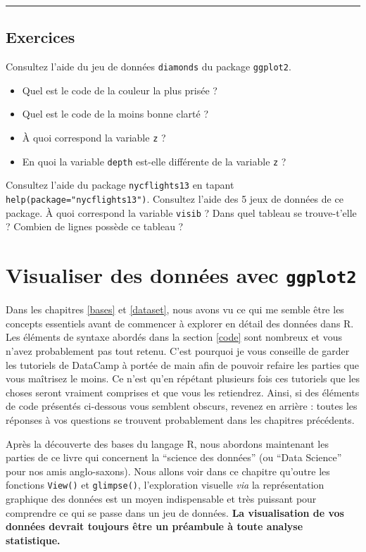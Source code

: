 \documentclass[a4paperpaper,]{article}
\providecommand{\tightlist}{%
  \setlength{\itemsep}{0pt}\setlength{\parskip}{0pt}}
\theoremstyle{definition}
\theoremstyle{definition}
\theoremstyle{definition}
\theoremstyle{remark}
\begin{document}
\begin{center}\rule{0.5\linewidth}{\linethickness}\end{center}

\subsection{Exercices}\label{exercices-1}

Consultez l'aide du jeu de données \texttt{diamonds} du package
\texttt{ggplot2}.

\begin{itemize}
\tightlist
\item
  Quel est le code de la couleur la plus prisée ?
\item
  Quel est le code de la moins bonne clarté ?
\item
  À quoi correspond la variable \texttt{z} ?
\item
  En quoi la variable \texttt{depth} est-elle différente de la variable
  \texttt{z} ?
\end{itemize}

Consultez l'aide du package \texttt{nycflights13} en tapant
\texttt{help(package="nycflights13")}. Consultez l'aide des 5 jeux de
données de ce package. À quoi correspond la variable \texttt{visib} ?
Dans quel tableau se trouve-t'elle ? Combien de lignes possède ce
tableau ?

\section{\texorpdfstring{Visualiser des données avec
\texttt{ggplot2}}{Visualiser des données avec ggplot2}}\label{viz}

Dans les chapitres \ref{bases} et \ref{dataset}, nous avons vu ce qui me
semble être les concepts essentiels avant de commencer à explorer en
détail des données dans R. Les éléments de syntaxe abordés dans la
section \ref{code} sont nombreux et vous n'avez probablement pas tout
retenu. C'est pourquoi je vous conseille de garder les tutoriels de
DataCamp à portée de main afin de pouvoir refaire les parties que vous
maîtrisez le moins. Ce n'est qu'en répétant plusieurs fois ces tutoriels
que les choses seront vraiment comprises et que vous les retiendrez.
Ainsi, si des éléments de code présentés ci-dessous vous semblent
obscurs, revenez en arrière : toutes les réponses à vos questions se
trouvent probablement dans les chapitres précédents.

Après la découverte des bases du langage R, nous abordons maintenant les
parties de ce livre qui concernent la ``science des données'' (ou ``Data
Science'' pour nos amis anglo-saxons). Nous allons voir dans ce chapitre
qu'outre les fonctions \texttt{View()} et \texttt{glimpse()},
l'exploration visuelle \emph{via} la représentation graphique des
données est un moyen indispensable et très puissant pour comprendre ce
qui se passe dans un jeu de données. \textbf{La visualisation de vos
données devrait toujours être un préambule à toute analyse statistique.}
\end{document}
